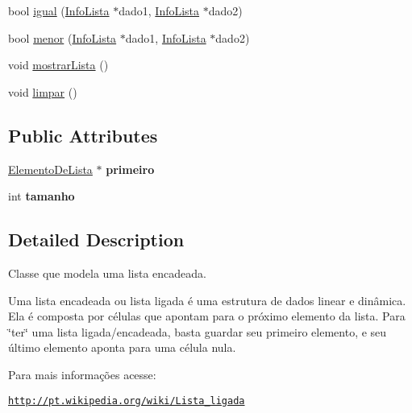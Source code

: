 \begin{DoxyCompactItemize}
\item 
bool \hyperlink{classCabecaDeLista_a276284222f5596116cc651d8ebe67b25}{igual} (\hyperlink{classInfoLista}{InfoLista} $\ast$dado1, \hyperlink{classInfoLista}{InfoLista} $\ast$dado2)
\item 
bool \hyperlink{classCabecaDeLista_a7599301a58eb2d47915cc5c369eb07c7}{menor} (\hyperlink{classInfoLista}{InfoLista} $\ast$dado1, \hyperlink{classInfoLista}{InfoLista} $\ast$dado2)
\item 
void \hyperlink{classCabecaDeLista_a7cc8cd2afde1701b051a1e189cc307c2}{mostrarLista} ()
\item 
void \hyperlink{classCabecaDeLista_ac66cf4f88607c48bc90ffd48c8786dab}{limpar} ()
\end{DoxyCompactItemize}
\subsection*{Public Attributes}
\begin{DoxyCompactItemize}
\item 
\hypertarget{classCabecaDeLista_a145b892c11847087e16685c952464a23}{
\hyperlink{classElementoDeLista}{ElementoDeLista} $\ast$ {\bfseries primeiro}}
\label{classCabecaDeLista_a145b892c11847087e16685c952464a23}

\item 
\hypertarget{classCabecaDeLista_a673d6447d41d673f0323c4a33237ad8a}{
int {\bfseries tamanho}}
\label{classCabecaDeLista_a673d6447d41d673f0323c4a33237ad8a}

\end{DoxyCompactItemize}


\subsection{Detailed Description}
Classe que modela uma lista encadeada.

Uma lista encadeada ou lista ligada é uma estrutura de dados linear e dinâmica. Ela é composta por células que apontam para o próximo elemento da lista. Para \char`\"{}ter\char`\"{} uma lista ligada/encadeada, basta guardar seu primeiro elemento, e seu último elemento aponta para uma célula nula.\par
 Para mais informações acesse:\par
 \href{http://pt.wikipedia.org/wiki/Lista_ligada}{\tt http://pt.wikipedia.org/wiki/Lista\_\-ligada} 

